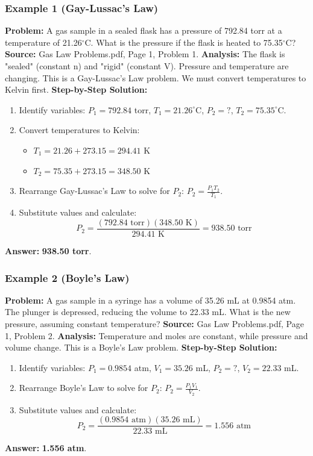 \documentclass{article}
\begin{document}
\subsubsection{Example 1 (Gay-Lussac's Law)}
\textbf{Problem:} A gas sample in a sealed flask has a pressure of 792.84 torr at a temperature of 21.26$^\circ$C. What is the pressure if the flask is heated to 75.35$^\circ$C?
\textbf{Source:} Gas Law Problems.pdf, Page 1, Problem 1.
\textbf{Analysis:} The flask is "sealed" (constant n) and "rigid" (constant V). Pressure and temperature are changing. This is a Gay-Lussac's Law problem. We must convert temperatures to Kelvin first.
\textbf{Step-by-Step Solution:}
\begin{enumerate}
    \item Identify variables: $P_1 = 792.84$ torr, $T_1 = 21.26^\circ$C, $P_2 = ?$, $T_2 = 75.35^\circ$C.
    \item Convert temperatures to Kelvin:
    \begin{itemize}
        \item $T_1 = 21.26 + 273.15 = 294.41$ K
        \item $T_2 = 75.35 + 273.15 = 348.50$ K
    \end{itemize}
    \item Rearrange Gay-Lussac's Law to solve for $P_2$: $P_2 = \frac{P_1 T_2}{T_1}$.
    \item Substitute values and calculate:
    \[ P_2 = \frac{(792.84 \text{ torr})(348.50 \text{ K})}{294.41 \text{ K}} = 938.50 \text{ torr} \]
\end{enumerate}
\textbf{Answer:} \textbf{938.50 torr}.

\subsubsection{Example 2 (Boyle's Law)}
\textbf{Problem:} A gas sample in a syringe has a volume of 35.26 mL at 0.9854 atm. The plunger is depressed, reducing the volume to 22.33 mL. What is the new pressure, assuming constant temperature?
\textbf{Source:} Gas Law Problems.pdf, Page 1, Problem 2.
\textbf{Analysis:} Temperature and moles are constant, while pressure and volume change. This is a Boyle's Law problem.
\textbf{Step-by-Step Solution:}
\begin{enumerate}
    \item Identify variables: $P_1 = 0.9854$ atm, $V_1 = 35.26$ mL, $P_2 = ?$, $V_2 = 22.33$ mL.
    \item Rearrange Boyle's Law to solve for $P_2$: $P_2 = \frac{P_1 V_1}{V_2}$.
    \item Substitute values and calculate:
    \[ P_2 = \frac{(0.9854 \text{ atm})(35.26 \text{ mL})}{22.33 \text{ mL}} = 1.556 \text{ atm} \]
\end{enumerate}
\textbf{Answer:} \textbf{1.556 atm}.
\end{document}
